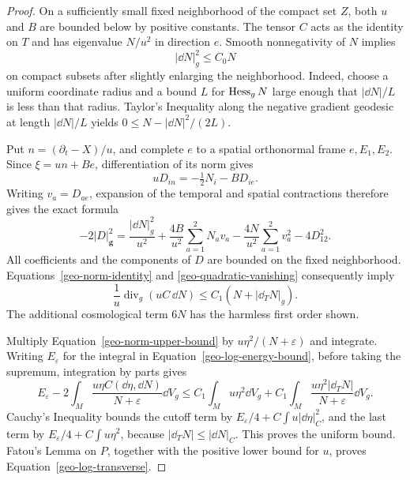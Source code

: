 \begin{proof}
On a sufficiently small fixed neighborhood of the compact set $Z$, both
$u$ and $B$ are bounded below by positive constants.  The tensor $C$ acts as
the identity on $T$ and has eigenvalue $N/u^2$ in direction $e$.
Smooth nonnegativity of $N$ implies
\begin{equation}
 |\dd N|_g^2\leq C_0N
 \label{geo-quadratic-vanishing}
\end{equation}
on compact subsets after slightly enlarging the neighborhood.  Indeed,
choose a uniform coordinate radius and a bound $L$ for $\operatorname{Hess}_gN$ large
enough that $|\dd N|/L$ is less than that radius.  Taylor's Inequality along
the negative gradient geodesic at length $|\dd N|/L$ yields
$0\leq N-|\dd N|^2/(2L)$.

Put $n=(\partial_t-X)/u$, and complete $e$ to a spatial orthonormal frame
$e,E_1,E_2$.  Since $\xi=un+Be$, differentiation of its norm gives
\[
 uD_{in}=-\tfrac12N_i-BD_{ie}.
\]
Writing $v_a=D_{ae}$, expansion of the temporal and spatial contractions
therefore gives the exact formula
\begin{equation}
 -2|D|_{\mathbf g}^2
 =\frac{|\dd N|_g^2}{u^2}
   +\frac{4B}{u^2}\sum_{a=1}^2N_av_a
   -\frac{4N}{u^2}\sum_{a=1}^2v_a^2-4D_{12}^2.
 \label{geo-D-expansion}
\end{equation}
All coefficients and the components of $D$ are bounded on the fixed
neighborhood.  Equations~\eqref{geo-norm-identity} and
\eqref{geo-quadratic-vanishing} consequently imply
\begin{equation}
 \frac1u\operatorname{div}_g(uC\,\dd N)
                  \leq C_1(N+|\dd_TN|_g).
 \label{geo-norm-upper-bound}
\end{equation}
The additional cosmological term $6N$ has the harmless first order shown.

Multiply Equation~\eqref{geo-norm-upper-bound} by
$u\eta^2/(N+\varepsilon)$ and integrate. Writing $E_\varepsilon$ for the
integral in Equation~\eqref{geo-log-energy-bound}, before taking the
supremum, integration by parts gives
\[
 E_\varepsilon
 -2\int_M\frac{u\eta C(\dd\eta,\dd N)}{N+\varepsilon}\dd V_g
 \leq C_1\int_Mu\eta^2\dd V_g
    +C_1\int_M\frac{u\eta^2|\dd_TN|}{N+\varepsilon}\dd V_g.
\]
Cauchy's Inequality bounds the cutoff term by
$E_\varepsilon/4+C\int u|\dd\eta|_C^2$, and the last term by
$E_\varepsilon/4+C\int u\eta^2$, because
$|\dd_TN|\leq|\dd N|_C$.  This proves the uniform bound.  Fatou's Lemma on
$P$, together with the positive lower bound for $u$, proves
Equation~\eqref{geo-log-transverse}.
\end{proof}


